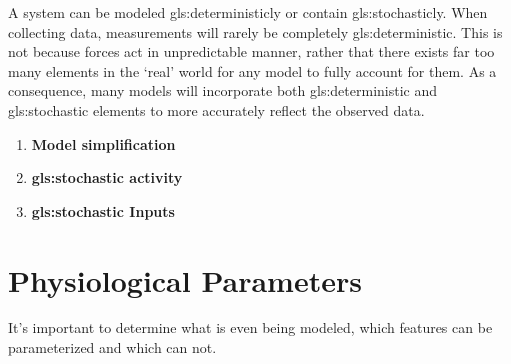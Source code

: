 A system can be modeled \gls{gls:deterministic}ly or contain \gls{gls:stochastic}ly. When collecting data, measurements will rarely be completely \gls{gls:deterministic}. This is not because forces act in unpredictable manner, rather that there exists far too many elements in the `real' world for any model to fully account for them. 
As a consequence, many models will incorporate both \gls{gls:deterministic} and \gls{gls:stochastic} elements to more accurately reflect the observed data.
\begin{enumerate}
    \item \textbf{Model simplification}
    \item \textbf{\Gls{gls:stochastic} activity}
    \item \textbf{\gls{gls:stochastic} Inputs}
\end{enumerate}



\newpage
\section{Physiological Parameters}
It's important to determine what is even being modeled, which features can be parameterized and which can not.




